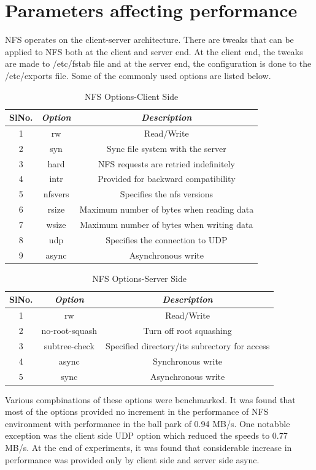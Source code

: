 \documentclass[conference]{IEEEtran}
\begin{document}
\section{Parameters affecting performance}
NFS operates on the client-server architecture. There are tweaks that can
be applied to NFS both at the client and server end. At the client end, the
tweaks are made to /etc/fstab file and at the server end, the configuration
is done to the /etc/exports file. Some of the commonly used options are listed below.
\begin{table}[htbp]
\caption{NFS Options-Client Side}
\begin{center}
\begin{tabular}{|c|c|c|}
\hline
\cline{2-3} 
\textbf{SlNo.} & \textbf{\textit{Option}}& \textbf{\textit{Description}} \\
\hline
1& rw & Read/Write  \\
2& syn & Sync file system with the server  \\
3& hard & NFS requests are retried indefinitely  \\
4& intr & Provided for backward compatibility \\
5& nfsvers & Specifies the nfs versions  \\
6& rsize & Maximum number of bytes when reading data  \\
7& wsize & Maximum number of bytes when writing data  \\
8& udp & Specifies the connection to UDP  \\
9& async & Asynchronous write  \\
\hline
\end{tabular}
\label{tab2}
\end{center}
\end{table}
\begin{table}[htbp]
\caption{NFS Options-Server Side}
\begin{center}
\begin{tabular}{|c|c|c|}
\hline
\cline{2-3} 
\textbf{SlNo.} & \textbf{\textit{Option}}& \textbf{\textit{Description}} \\
\hline
1& rw & Read/Write  \\
2& no-root-squash & Turn off root squashing  \\
3& subtree-check & Specified directory/its subrectory for access  \\
4& async & Synchronous write \\
5& sync & Asynchronous write  \\
\hline
\end{tabular}
\label{tab1}
\end{center}
\end{table}
Various compbinations of these options were benchmarked. It was found that
most of the options provided no increment in the performance of NFS
environment with performance in the ball park of 0.94 MB/s.
One notabble
exception was the client side UDP option which reduced the speeds to
0.77 MB/s. At the end of experiments, it was found that considerable 
increase in performance was provided only by client side and server side 
async.
\end{document}
